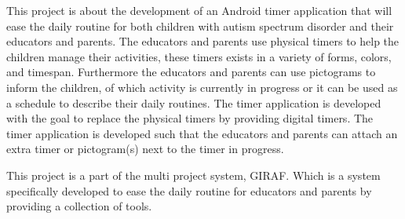 \vspace{0.3cm}
This project is about the development of an Android timer application that will ease the daily routine for both children with autism spectrum disorder and their educators and parents. The educators and parents use physical timers to help the children manage their activities, these timers exists in a variety of forms, colors, and timespan. Furthermore the educators and parents can use pictograms to inform the children, of which activity is currently in progress or it can be used as a schedule to describe their daily routines. The timer application is developed with the goal to replace the physical timers by providing digital timers. The timer application is developed such that the educators and parents can attach an extra timer or pictogram(s) next to the timer in progress.

This project is a part of the multi project system, GIRAF. Which is a system specifically developed to ease the daily routine for educators and parents by providing a collection of tools.